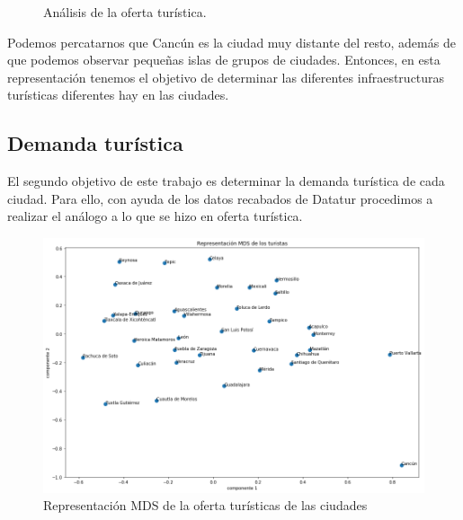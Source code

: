 \documentclass[11pt,letterpaper]{article}
\begin{document}
\begin{figure}[H]
\endminipage
\caption{Análisis de la oferta turística.}\label{oferta_turistica}
\end{figure}
Podemos percatarnos que Cancún es la ciudad muy distante del resto, además de que podemos observar pequeñas islas de grupos de ciudades. Entonces, en esta representación tenemos el objetivo de determinar las diferentes infraestructuras turísticas diferentes hay en las ciudades.

\subsection{Demanda turística}
El segundo objetivo de este trabajo es determinar la demanda turística de cada ciudad. Para ello, con ayuda de los datos recabados de Datatur procedimos a realizar el análogo a lo que se hizo en oferta turística. 
\begin{figure}[H]
  \includegraphics[width=\linewidth]{figure/demanda_turistica_c.png}
    \caption{Representación MDS de la oferta turísticas de las ciudades}
    \label{fig:demanda_turistica_c}
\endminipage\hfill
{}

\end{figure}
\end{document}
